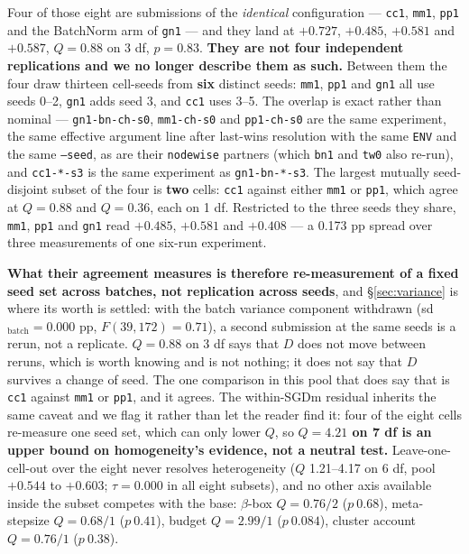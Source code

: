 \documentclass[10pt,letterpaper]{article}
\newcommand{\Dstat}{D}                         %
\newcommand{\arm}[1]{\texttt{#1}}
\begin{document}
Four of those eight are submissions of the \emph{identical} configuration --- \arm{cc1},
\arm{mm1}, \arm{pp1} and the BatchNorm arm of \arm{gn1} --- and they land
at $+0.727$, $+0.485$, $+0.581$ and $+0.587$, $Q = 0.88$ on 3 df, $p = 0.83$. \textbf{They are
not four independent replications and we no longer describe them as such.} Between them the four
draw thirteen cell-seeds from \textbf{six} distinct seeds: \arm{mm1}, \arm{pp1} and \arm{gn1} all
use seeds 0--2, \arm{gn1} adds seed 3, and \arm{cc1} uses 3--5. The overlap is exact rather than
nominal --- \arm{gn1-bn-ch-s0}, \arm{mm1-ch-s0} and \arm{pp1-ch-s0} are the same experiment, the
same effective argument line after last-wins resolution with the same \texttt{ENV} and the same
\texttt{--seed}, as are their \arm{nodewise} partners (which \arm{bn1} and \arm{tw0} also re-run),
and \arm{cc1-*-s3} is the same experiment as \arm{gn1-bn-*-s3}. The largest mutually seed-disjoint
subset of the four is \textbf{two} cells: \arm{cc1} against either \arm{mm1} or \arm{pp1}, which
agree at $Q = 0.88$ and $Q = 0.36$, each on 1 df. Restricted to the three seeds they share,
\arm{mm1}, \arm{pp1} and \arm{gn1} read $+0.485$, $+0.581$ and $+0.408$ --- a 0.173 pp spread over
three measurements of one six-run experiment.

\textbf{What their agreement measures is therefore re-measurement of a fixed seed set across
batches, not replication across seeds}, and \S\ref{sec:variance} is where its worth is settled:
with the batch variance component withdrawn (sd$_{\text{batch}} = 0.000$ pp, $F(39,172) = 0.71$),
a second submission at the same seeds is a rerun, not a replicate. $Q = 0.88$ on 3 df says that
$\Dstat$ does not move between reruns, which is worth knowing and is not nothing; it does not say
that $\Dstat$ survives a change of seed. The one comparison in this pool that does say that is
\arm{cc1} against \arm{mm1} or \arm{pp1}, and it agrees. The within-SGDm residual inherits the
same caveat and we flag it rather than let the reader find it: four of the eight cells re-measure
one seed set, which can only lower $Q$, so \textbf{$Q = 4.21$ on 7 df is an upper bound on
homogeneity's evidence, not a neutral test.}
Leave-one-cell-out over the eight never resolves heterogeneity ($Q$ 1.21--4.17 on 6 df, pool
$+0.544$ to $+0.603$; $\tau = 0.000$ in all eight subsets), and no other axis available inside
the subset competes with the base: $\beta$-box $Q = 0.76/2$ ($p\ 0.68$), meta-stepsize
$Q = 0.68/1$ ($p\ 0.41$), budget $Q = 2.99/1$ ($p\ 0.084$), cluster account $Q = 0.76/1$
($p\ 0.38$).
\end{document}
